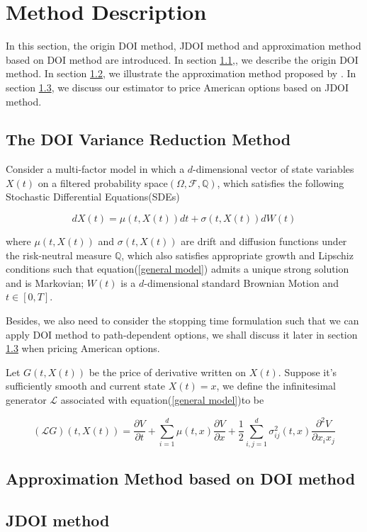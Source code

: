 \chapter{Method Description}

In this section, the origin DOI method, JDOI method and approximation method based on DOI method are introduced. In section \ref{sec: 2.1},, we describe the origin DOI method. In section \ref{sec: 2.2}, we illustrate the approximation method proposed by \cite{kristensen_adding_2011}. In section \ref{sec: 2.3}, we discuss our estimator to price American options based on JDOI method.

\section{The DOI Variance Reduction Method}
\label{sec: 2.1}

Consider a multi-factor model in which a $d$-dimensional vector of state variables $X(t)$ on a filtered probability space$(\Omega,\mathcal F, \mathbb Q)$, which satisfies the following Stochastic Differential Equations(SDEs)

\begin{equation}\label{general model}
    dX(t) = \mu(t, X(t)) dt + \sigma(t, X(t)) dW(t)
\end{equation}

\noindent where $\mu(t,X(t))$ and $\sigma(t, X(t))$ are drift and diffusion functions under the risk-neutral measure $\mathbb Q$, which also satisfies appropriate growth and Lipschiz conditions such that equation(\ref{general model}) admits a unique strong solution and is Markovian; $W(t)$ is a $d$-dimensional standard Brownian Motion and $t \in [0,T]$.

Besides, we also need to consider the stopping time formulation such that we can apply DOI method to path-dependent options, we shall discuss it later in section \ref{sec: 2.3} when pricing American options.

Let $G(t, X(t))$ be the price of derivative written on $X(t)$. Suppose it's sufficiently smooth and current state $X(t) = x$, we define the infinitesimal generator $\mathcal L$ associated with equation(\ref{general model})to be

\begin{equation}
    (\mathcal{L} G)(t, X(t))=\frac{\partial V}{\partial t} + \sum_{i=1}^{d} \mu(t, x) \frac{\partial V}{\partial x}+\frac{1}{2} \sum_{i, j=1}^{d} \sigma_{i j}^2(t,x) \frac{\partial^2 V}{\partial x_i x_j}
\end{equation}
\section{Approximation Method based on DOI method}
\label{sec: 2.2}

\section{JDOI method}
\label{sec: 2.3}
  
\normalsize 


